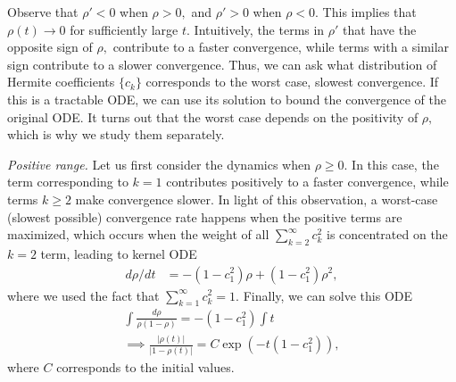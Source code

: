 \documentclass[twoside]{article}
\theoremstyle{definition}
\newcommand{\thomas}[1]{{\color{blue}\textit{#1}}}
\begin{document}
Observe that $\rho'<0$ when $\rho>0,$ and $\rho'>0$ when $\rho<0.$ This implies that $\rho(t) \to 0$ for sufficiently large $t.$ Intuitively, the terms in $\rho'$ that have the opposite sign of $\rho,$ contribute to a faster convergence, while terms with a similar sign contribute to a slower convergence. Thus, we can ask what distribution of Hermite coefficients $\{c_k\}$ corresponds to the worst case, slowest convergence. If this is a tractable ODE, we can use its solution to bound the convergence of the original ODE. It turns out that the worst case depends on the positivity of $\rho,$ which is why we study them separately.

\textit{Positive range.}
Let us first consider the dynamics when $\rho\ge 0.$ 
In this case, the term corresponding to $k=1$ contributes positively to a faster convergence, while terms $k\ge 2$ make convergence slower. In light of this observation, a worst-case (slowest possible) convergence rate happens when the positive terms are maximized, which occurs when the weight of all $\sum_{k=2}^\infty c_k^2 $ is concentrated on the $k=2$ term, leading to kernel ODE
\begin{align*}
    d\rho/dt &=  -(1-c_1^2)\rho + (1-c_1^2) \rho^2,
\end{align*}
where we used the fact that $\sum_{k=1}^\infty c_k^2 = 1.$ 
Finally, we can solve this ODE 
\begin{align*}
     \int \frac{d\rho}{\rho(1-\rho)} = - (1-c_1^2)\int t \\
     \implies \frac{|\rho(t)|}{|1-\rho(t)|} = C \exp(-t(1-c_1^2)),
\end{align*}
where $C$ corresponds to the initial values. 
\end{document}
